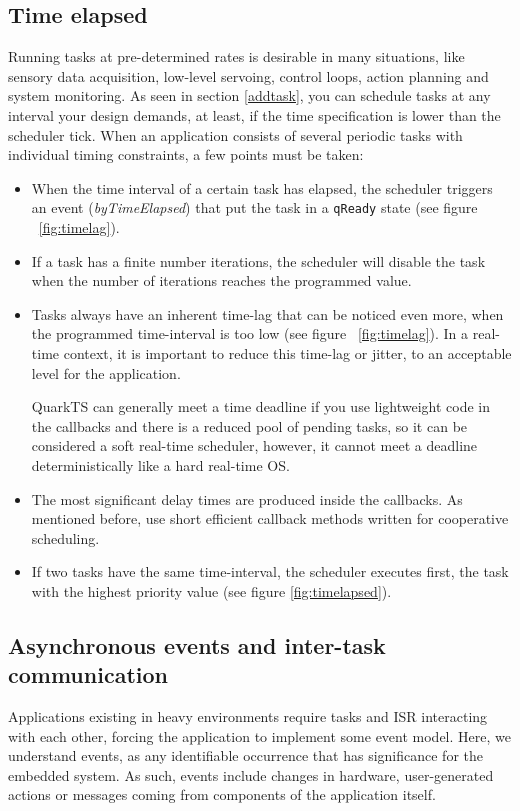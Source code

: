 \documentclass{article}
\begin{document}
\subsection{Time elapsed}
Running tasks at pre-determined rates is desirable in many situations, like sensory data acquisition, low-level servoing, control loops, action planning and system monitoring. As seen in section \ref{addtask}, you can schedule tasks at any interval your design demands, at least, if the time specification is lower than the scheduler tick. When an application consists of several periodic tasks with individual timing constraints, a few points must be taken:

\begin{itemize}
    \item When the time interval of a certain task has elapsed, the scheduler triggers an event (\textit{byTimeElapsed}) that put the task in a \lstinline{qReady} state  (see figure ~\ref{fig:timelag}).
    \item If a task has a finite number iterations, the scheduler will disable the task when the number of iterations reaches the programmed value.
    \item Tasks always have an inherent time-lag that can be noticed even more, when the programmed time-interval is too low (see figure ~\ref{fig:timelag}). In a real-time context, it is important to reduce this time-lag or jitter, to an acceptable level for the application. 
    \begin{tcolorbox}
    \HandRight QuarkTS can generally meet a time deadline if you use lightweight code in the callbacks and there is a reduced pool of pending tasks, so it can be considered a soft real-time scheduler, however,  it cannot meet a deadline deterministically like a hard real-time OS.
    \end{tcolorbox}

    

    \item The most significant delay times are produced inside the callbacks. As mentioned before, use short efficient callback methods written for cooperative scheduling.
    \item If two tasks have the same time-interval, the scheduler executes first, the task with the highest priority value (see figure \ref{fig:timelapsed}).

    
\end{itemize}
\subsection{Asynchronous events and inter-task communication}
Applications existing in heavy environments require tasks and ISR interacting with each other, forcing the application to implement some event model.
Here, we understand events, as any identifiable occurrence that has significance for the embedded system. As such, events include changes in hardware, user-generated actions or messages coming from components of the application itself.
\end{document}
